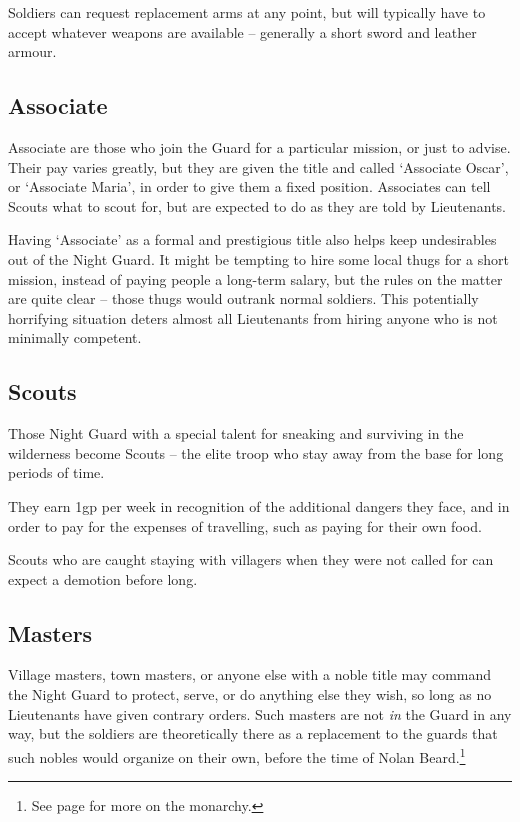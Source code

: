 \begin{multicols}{2}
Soldiers can request replacement arms at any point, but will typically have to accept whatever weapons are available -- generally a short sword and leather armour.

\subsection{Associate}

Associate are those who join the Guard for a particular mission, or just to advise.
Their pay varies greatly, but they are given the title and called `Associate Oscar', or `Associate Maria', in order to give them a fixed position.
Associates can tell Scouts what to scout for, but are expected to do as they are told by Lieutenants.

Having `Associate' as a formal and prestigious title also helps keep undesirables out of the Night Guard.
It might be tempting to hire some local thugs for a short mission, instead of paying people a long-term salary, but the rules on the matter are quite clear -- those thugs would outrank normal soldiers.
This potentially horrifying situation deters almost all Lieutenants from hiring anyone who is not minimally competent.

\subsection{Scouts}

Those Night Guard with a special talent for sneaking and surviving in the wilderness become Scouts -- the elite troop who stay away from the base for long periods of time.

They earn 1gp per week in recognition of the additional dangers they face, and in order to pay for the expenses of travelling, such as paying for their own food.

Scouts who are caught staying with villagers when they were not called for can expect a demotion before long.

\subsection{Masters}

Village masters, town masters, or anyone else with a noble title may command the Night Guard to protect, serve, or do anything else they wish, so long as no Lieutenants have given contrary orders.
Such masters are not \textit{in} the Guard in any way, but the soldiers are theoretically there as a replacement to the guards that such nobles would organize on their own, before the time of Nolan Beard.\footnote{See page \pageref{nolan} for more on the monarchy.}


\end{multicols}

